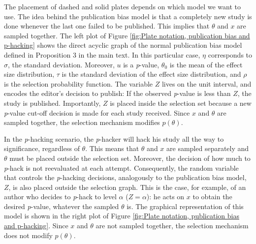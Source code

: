 \documentclass[english]{article}
\begin{document}
The placement of dashed and solid plates depends on which model we want to use. The idea behind the publication bias model is that a completely new study is done whenever the last one failed to be published. This implies that $\theta$ and $x$ are sampled together. The left plot of Figure \ref{fig:Plate notation, publication bias and p-hacking} shows the direct acyclic graph of the normal publication bias model defined in Proposition 3 in the main text. In this particular case, $\eta$ corresponds to $\sigma$, the standard deviation. Moreover, $u$ is a \textit{p}-value, $\theta_{0}$ is the mean of the effect size distribution, $\tau$ is the standard deviation of the effect size distribution, and $\rho$ is the selection probability function. The variable $Z$ lives on the unit interval, and encodes the editor's decision to publish: If the observed \textit{p}-value is less than $Z$, the study is published. Importantly, $Z$ is placed inside the selection set because a new \textit{p}-value cut-off decision is made for each study received. Since $x$ and $\theta$ are sampled together, the selection mechanism modifies $p(\theta)$.%

In the \textit{p}-hacking scenario, the \textit{p}-hacker will hack his study all the way to significance, regardless of $\theta$. This means that $\theta$ and $x$ are sampled separately and $\theta$ must be placed outside the selection set. Moreover, the decision of how much to \textit{p}-hack is not reevaluated at each attempt. Consequently, the random variable that controls the \textit{p}-hacking decisions, analogously to the publication bias model, $Z$, is also placed outside the selection graph. This is the case, for example, of an author who decides to \textit{p}-hack to level $\alpha$ ($Z = \alpha$): he acts on $x$ to obtain the desired \textit{p}-value, whatever the sampled $\theta$ is. The graphical representation of this model is shown in the right plot of Figure \ref{fig:Plate notation, publication bias and p-hacking}. Since $x$ and $\theta$ are not sampled together, the selection mechanism does not modify $p(\theta)$.
\end{document}
